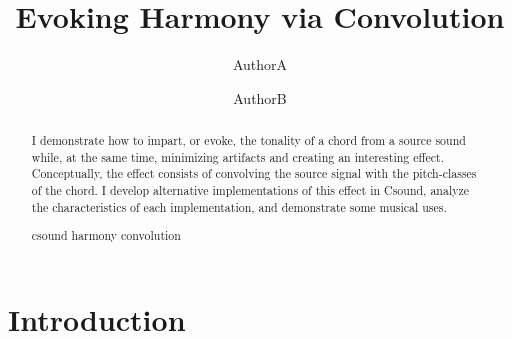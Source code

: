 \documentclass[runningheads,a4paper]{llncs}
\newcommand{\keywords}[1]{\par\addvspace\baselineskip
\noindent\keywordname\enspace\ignorespaces#1}
\begin{document}

\mainmatter  %

\title{Evoking Harmony via Convolution}




\author{AuthorA\and AuthorB}
%


%
%

\maketitle

\begin{abstract}
I demonstrate how to impart, or evoke, the tonality of a chord from a source 
sound while, at the same time, minimizing artifacts and creating an 
interesting effect. Conceptually, the effect consists of convolving the 
source signal with the pitch-classes of the chord. I develop alternative 
implementations of this effect in Csound, analyze the characteristics of each 
implementation, and demonstrate some musical uses.
\keywords{csound harmony convolution}
\end{abstract}

\section{Introduction}
\end{document}
